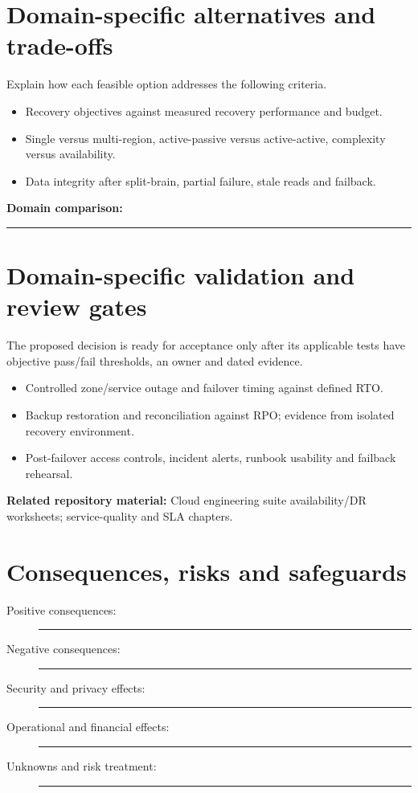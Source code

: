 \documentclass[11pt,letterpaper]{article}
\newcommand{\BlankResponse}{\rule[-0.4em]{0pt}{2em}\rule{0.65\linewidth}{0.4pt}}
\begin{document}
\section{Domain-specific alternatives and trade-offs}
Explain how each feasible option addresses the following criteria.
\begin{itemize}
\item Recovery objectives against measured recovery performance and budget.
\item Single versus multi-region, active-passive versus active-active, complexity versus availability.
\item Data integrity after split-brain, partial failure, stale reads and failback.
\end{itemize}
\noindent\textbf{Domain comparison:} \BlankResponse
\section{Domain-specific validation and review gates}
The proposed decision is ready for acceptance only after its applicable
tests have objective pass/fail thresholds, an owner and dated evidence.
\begin{itemize}
\item Controlled zone/service outage and failover timing against defined RTO.
\item Backup restoration and reconciliation against RPO; evidence from isolated recovery environment.
\item Post-failover access controls, incident alerts, runbook usability and failback rehearsal.
\end{itemize}
\noindent\textbf{Related repository material:} Cloud engineering suite availability/DR worksheets; service-quality and SLA chapters.

\section{Consequences, risks and safeguards}
\begin{description}
\item[Positive consequences:] \BlankResponse
\item[Negative consequences:] \BlankResponse
\item[Security and privacy effects:] \BlankResponse
\item[Operational and financial effects:] \BlankResponse
\item[Unknowns and risk treatment:] \BlankResponse
\end{description}
\end{document}
